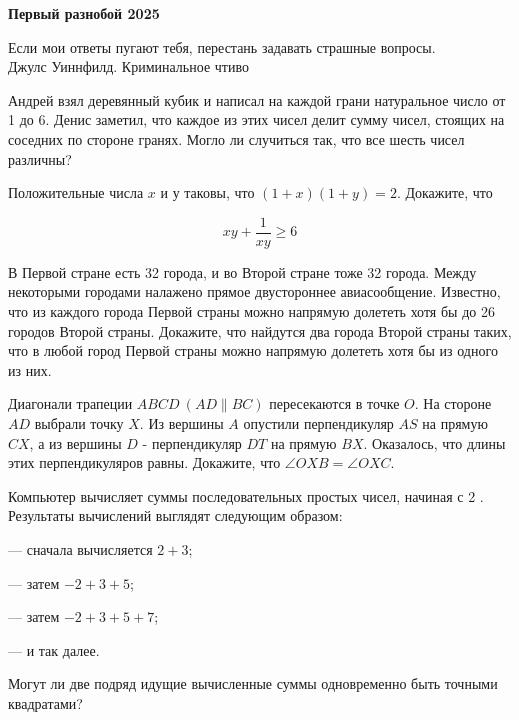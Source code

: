 \centerline{\bf \Huge Первый разнобой 2025}

\begin{flushright}
        \scriptsize{ Если мои ответы пугают тебя, перестань задавать страшные вопросы.\\Джулс Уиннфилд. Криминальное чтиво}
\end{flushright}

Андрей взял деревянный кубик и написал на каждой грани натуральное число от 1 до 6. Денис заметил, что каждое из этих чисел делит сумму чисел, стоящих на соседних по стороне гранях. Могло ли случиться так, что все шесть чисел различны?

Положительные числа $x$ и $у$ таковы, что $(1+x)(1+y)=2$. Докажите, что

$$
x y+\frac{1}{x y} \geqslant 6
$$

В Первой стране есть 32 города, и во Второй стране тоже 32 города. Между некоторыми городами налажено прямое двустороннее авиасообщение. Известно, что из каждого города Первой страны можно напрямую долететь хотя бы до 26 городов Второй страны. Докажите, что найдутся два города Второй страны таких, что в любой город Первой страны можно напрямую долететь хотя бы из одного из них.

Диагонали трапеции $A B C D\ (A D \| B C)$ пересекаются в точке $O$. На стороне $A D$ выбрали точку $X$. Из вершины $A$ опустили перпендикуляр $A S$ на прямую $C X$, а из вершины $D$ - перпендикуляр $D T$ на прямую $B X$. Оказалось, что длины этих перпендикуляров равны. Докажите, что $\angle O X B=\angle O X C$.

Компьютер вычисляет суммы последовательных простых чисел, начиная с 2 . Результаты вычислений выглядят следующим образом:

--- сначала вычисляется $2+3$;

--- затем $-2+3+5$;

--- затем $-2+3+5+7$;

--- и так далее.

Могут ли две подряд идущие вычисленные суммы одновременно быть точными квадратами?

